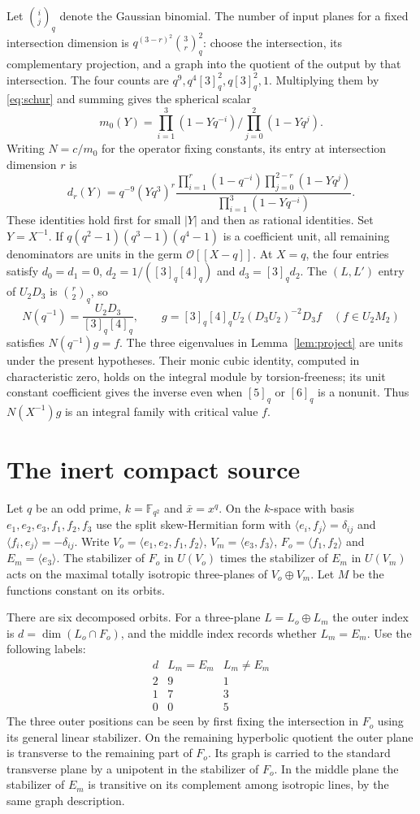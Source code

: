 \documentclass[11pt]{article}
\newcommand{\F}{\mathbb F}
\begin{document}
Let $\binom{i}{j}_q$ denote the Gaussian binomial. The number of input
planes for a fixed intersection dimension is $q^{(3-r)^2}\binom{3}{r}_q^2$:
choose the intersection, its complementary projection, and a graph
into the quotient of the output by that intersection. The four counts
are $q^9,q^4[3]_q^2,q[3]_q^2,1$. Multiplying them by \eqref{eq:schur}
and summing gives the spherical scalar
\[
 m_0(Y)=\prod_{i=1}^3(1-Yq^{-i})\big/\prod_{j=0}^2(1-Yq^j).
\]
Writing $N=c/m_0$ for the operator fixing constants, its entry at
intersection dimension $r$ is
\[
 d_r(Y)=q^{-9}(Yq^3)^r
 \frac{\prod_{i=1}^r(1-q^{-i})\prod_{j=0}^{2-r}(1-Yq^j)}
      {\prod_{i=1}^3(1-Yq^{-i})}.
\]
These identities hold first for small $|Y|$ and then as rational
identities. Set $Y=X^{-1}$. If $q(q^2-1)(q^3-1)(q^4-1)$ is a
coefficient unit, all remaining denominators are units in the
germ $\mathcal O[[X-q]]$. At $X=q$, the four entries satisfy
$d_0=d_1=0$, $d_2=1/([3]_q[4]_q)$ and $d_3=[3]_qd_2$. The
$(L,L')$ entry of $U_2D_3$ is $\binom{r}{2}_q$, so
\[
 N(q^{-1})=\frac{U_2D_3}{[3]_q[4]_q},\qquad
 g=[3]_q[4]_q U_2(D_3U_2)^{-2}D_3 f \quad(f\in U_2M_2)
\]
satisfies $N(q^{-1})g=f$. The three eigenvalues in
Lemma~\ref{lem:project} are units under the present hypotheses.
Their monic cubic identity, computed in characteristic zero, holds on
the integral module by torsion-freeness; its unit constant coefficient
gives the inverse even when $[5]_q$ or $[6]_q$ is a nonunit.
Thus $N(X^{-1})g$ is an integral family with critical value $f$.

\section{The inert compact source}

Let $q$ be an odd prime, $k=\F_{q^2}$ and
$\bar x=x^q$. On the $k$-space with basis
$e_1,e_2,e_3,f_1,f_2,f_3$ use the split skew-Hermitian form with
$\langle e_i,f_j\rangle=\delta_{ij}$ and
$\langle f_i,e_j\rangle=-\delta_{ij}$. Write
$V_o=\langle e_1,e_2,f_1,f_2\rangle$,
$V_m=\langle e_3,f_3\rangle$,
$F_o=\langle f_1,f_2\rangle$ and $E_m=\langle e_3\rangle$.
The stabilizer of $F_o$ in $U(V_o)$ times the stabilizer of $E_m$ in
$U(V_m)$ acts on the maximal totally isotropic three-planes of
$V_o\oplus V_m$. Let $M$ be the functions constant on its orbits.

There are six decomposed orbits. For a three-plane
$L=L_o\oplus L_m$ the outer index is
$d=\dim(L_o\cap F_o)$, and the middle index records whether
$L_m=E_m$. Use the following labels:
\[
\begin{array}{c|cc}
d&L_m=E_m&L_m\ne E_m\\\hline
2&9&1\\1&7&3\\0&0&5
\end{array}
\]
The three outer positions can be seen by first fixing the intersection
in $F_o$ using its general linear stabilizer. On the remaining
hyperbolic quotient the outer plane is transverse to the remaining
part of $F_o$. Its graph is carried to the standard transverse plane
by a unipotent in the stabilizer of $F_o$. In the middle plane the
stabilizer of $E_m$ is transitive on its complement among isotropic
lines, by the same graph description.
\end{document}
